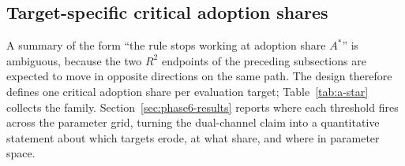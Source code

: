 \documentclass[12pt]{article}
\begin{document}
\subsection{Target-specific critical adoption shares}\label{sec:metrics-a-star}

A summary of the form ``the rule stops working at adoption share $A^{*}$'' is ambiguous, because the two $R^{2}$ endpoints of the preceding subsections are expected to move in opposite directions on the same path. The design therefore defines one critical adoption share per evaluation target; Table~\ref{tab:a-star} collects the family. %
Section~\ref{sec:phase6-results} reports where each threshold fires across the parameter grid, turning the dual-channel claim into a quantitative statement about which targets erode, at what share, and where in parameter space. %
\end{document}

